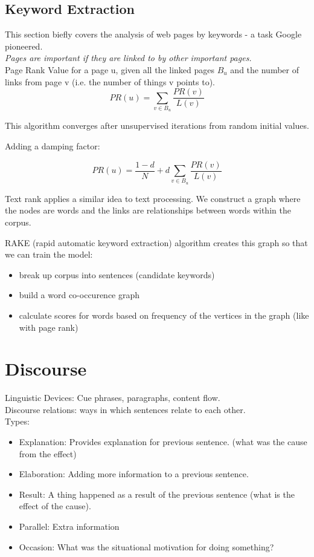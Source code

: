 \documentclass[]{article}
\begin{document}
    \subsection{Keyword Extraction}
This section biefly covers the analysis of web pages by keywords - a task Google pioneered. \\
    
    \textit{Pages are important if they are linked to by other important pages.} \\
    
    Page Rank Value for a page u, given all the linked pages $B_u$ and the number of links from page v (i.e. the number of things v points to). 
    $$PR(\mathit{u}) = \sum_{v \in B_u} \frac{PR(v)}{L(v)}$$
   
    This algorithm converges after unsupervised iterations from random initial values.
   
    Adding a damping factor: 
    
    $$PR(\mathit{u}) = \frac{1-d}{N} + d \sum_{v \in B_u} \frac{PR(v)}{L(v)}$$
    
    Text rank applies a similar idea to text processing. We construct a graph where the nodes are words and the links are relationships between words within the corpus.
    
    RAKE (rapid automatic keyword extraction) algorithm creates this graph so that we can train the model:
    
    \begin{itemize}
     \item break up corpus into sentences (candidate keywords)
     \item build a word co-occurence graph
     \item calculate scores for words based on frequency of the vertices in the graph (like with page rank)
    \end{itemize}
    
    \clearpage
	\section{Discourse}
	Linguistic Devices: Cue phrases, paragraphs, content flow. \\
	Discourse relations: ways in which sentences relate to each other. \\
	Types: 
	\begin{itemize}
	 \item Explanation: Provides explanation for previous sentence. (what was the cause from the effect)
	 \item Elaboration: Adding more information to a previous sentence. 
	 \item Result: A thing happened as a result of the previous sentence (what is the effect of the cause).
	 \item Parallel: Extra information  
	 \item Occasion: What was the situational motivation for doing something?
	\end{itemize}
	
\end{document}

